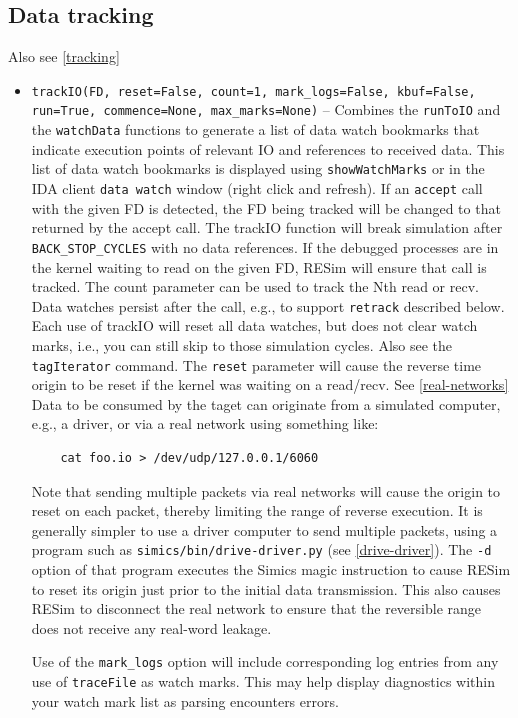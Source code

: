 \documentclass[titlepage]{article}
\begin{document}
\subsection{Data tracking}
Also see \ref{tracking}
\begin{itemize}

\item {\tt trackIO(FD, reset=False, count=1, mark\_logs=False, kbuf=False, run=True, commence=None, max\_marks=None)} -- Combines the {\tt runToIO} and the {\tt watchData} functions to generate a list of data watch bookmarks that indicate execution
points of relevant IO and references to received data.  This list of data watch bookmarks is displayed using {\tt showWatchMarks} or in the IDA client {\tt data watch} window (right click and refresh).
If an {\tt accept} call with the given FD is detected, the FD being tracked will be changed to that returned by the accept call.
The trackIO function will break simulation after {\tt BACK\_STOP\_CYCLES} with no data references. If the debugged processes are in the kernel waiting to read on the given
FD, RESim will ensure that call is tracked.  The count parameter can be used to track the Nth read or recv.   Data watches persist after the
call, e.g., to support {\tt retrack} described below.  Each use of trackIO will reset all data watches, but does not clear watch marks, i.e., you can still skip to those simulation cycles.  Also see 
the {\tt tagIterator} command.  The {\tt reset} parameter will cause the reverse time origin to be reset if the kernel was waiting on a read/recv. See \ref{real-networks}  Data to be consumed by the taget can originate from a simulated computer, e.g., a driver, or via a real network using something like:
\begin{verbatim}
    cat foo.io > /dev/udp/127.0.0.1/6060 
\end{verbatim}
\noindent Note that sending multiple packets via real networks will cause the origin to reset on each packet, thereby limiting the range of reverse execution.  It is generally simpler
to use a driver computer to send multiple packets, using a program such as {\tt simics/bin/drive-driver.py} (see \ref{drive-driver}).  The {\tt -d} option of that program executes the Simics magic instruction to cause RESim to reset
its origin just prior to the initial data transmission.  This also causes RESim to disconnect the real network to ensure that the reversible range does not receive any real-word leakage.

Use of the {\tt mark\_logs} option will include corresponding log entries from any use of {\tt traceFile} as watch marks.  This may help display diagnostics
within your watch mark list as parsing encounters errors.


\end{itemize}
\end{document}
